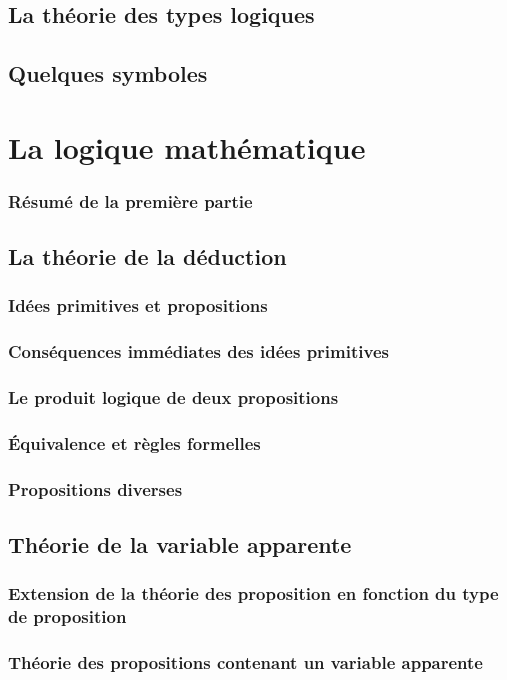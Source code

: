 \documentclass[a4paper]{book}
\begin{document}
\chapter{La théorie des types logiques}
\label{ch:typeLog}
\chapter{Quelques symboles}
\part{La logique mathématique}
\label{logiquemath}
\section*{Résumé de la première partie}
\chapter{La théorie de la déduction}
\section{Idées primitives et propositions}
\section{Conséquences immédiates des idées primitives}
\section{Le produit logique de deux propositions}
\section{\'Equivalence et règles formelles}
\section{Propositions diverses}
\chapter{Théorie de la variable apparente}
\section{Extension de la théorie des proposition en fonction du type de proposition}
\section{Théorie des propositions contenant un variable apparente}
\end{document}
